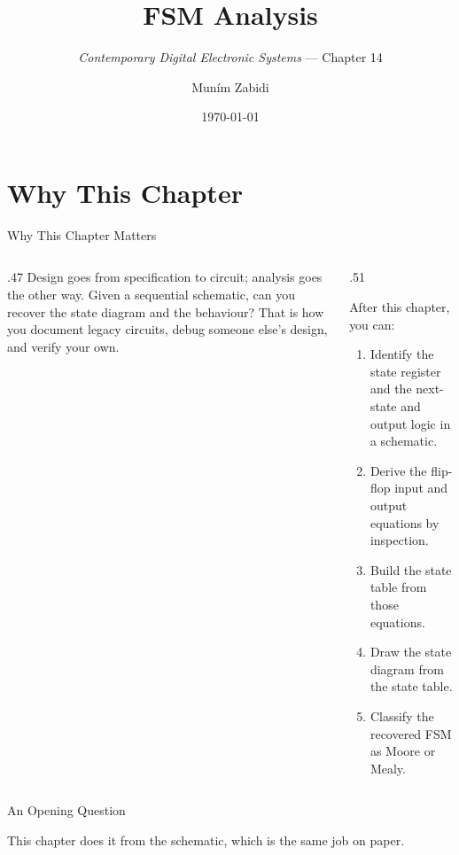 \documentclass[9pt,aspectratio=169,xcolor=table]{beamer}
\title{FSM Analysis}
\subtitle{\emph{Contemporary Digital Electronic Systems} --- Chapter 14}
\author{Mun\'{i}m Zabidi}
\institute{\color{primary}Faculty of Electrical Engineering, Universiti Teknologi Malaysia}
\date{\today}
\begin{document}
\titlepage

\section{Why This Chapter}

\begin{frame}{Why This Chapter Matters}
  \begin{columns}[c]
  \begin{column}{.47\textwidth}
    Design goes from specification to circuit; analysis goes the other way. Given a sequential schematic, can you recover the \alert{state diagram} and the behaviour? That is how you document legacy circuits, debug someone else's design, and verify your own.
  \end{column}
  \begin{column}{.51\textwidth}
    \begin{block}{After this chapter, you can:}
    {\small
    \begin{enumerate}\itemsep2pt
      \item Identify the state register and the next-state and output logic in a schematic.
      \item Derive the flip-flop input and output equations by inspection.
      \item Build the state table from those equations.
      \item Draw the state diagram from the state table.
      \item Classify the recovered FSM as Moore or Mealy.
    \end{enumerate}}
    \end{block}
  \end{column}
  \end{columns}
\end{frame}

\begin{frame}{An Opening Question}
  \leavevmode\vspace{4mm}
  \begin{center}
  \end{center}
  \vspace{4mm}
  This chapter does it from the schematic, which is the same job on paper.
\end{frame}
\end{document}
